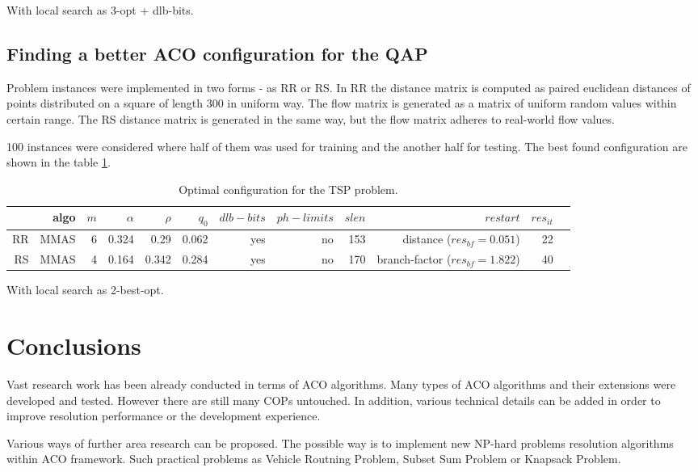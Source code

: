 \documentclass[12pt]{article}
\begin{document}
With local search as 3-opt + dlb-bits.

\subsection{Finding a better ACO configuration for the QAP}

Problem instances were implemented in two forms - as RR or RS. In RR the distance matrix is computed as paired euclidean distances of points distributed on a square of length 300 in uniform way. The flow matrix is generated as a matrix of uniform random values within certain range. The RS distance matrix is generated in the same way, but the flow matrix adheres to real-world flow values.

100 instances were considered where half of them was used for training and the another half for testing. The best found configuration are shown in the table \ref{table:table-qap}.

\begin{table}[ht]
\centering
\resizebox{\textwidth}{!}
{
\begin{tabular}{|r|r|r|r|r|r|r|r|r|r|r|r|}
  \hline 
    & algo & $m$ & $\alpha$ & $\rho$ & $q_0$ & $dlb-bits$ & $ph-limits$ & $slen$ & $restart$ & $res_{it}$\\ \hline
    RR & MMAS & 6 & 0.324 & 0.29 & 0.062 & yes & no & 153 & distance ($res_{bf} = 0.051$) & 22\\ \hline
	RS & MMAS & 4 & 0.164 & 0.342 & 0.284 & yes & no & 170 & branch-factor ($res_{bf} = 1.822$) & 40\\ \hline
\end{tabular}
}
\caption{Optimal configuration for the TSP problem.}
\label{table:table-qap} 
\end{table} 

With local search as 2-best-opt.

\section{Conclusions}

Vast research work has been already conducted in terms of ACO algorithms. Many types of ACO algorithms and their extensions were developed and tested. However there are still many COPs untouched. In addition, various technical details can be added in order to improve resolution performance or the development experience. 

Various ways of further area research can be proposed. The possible way is to implement new NP-hard problems resolution algorithms within ACO framework. Such practical problems as Vehicle Routning Problem, Subset Sum Problem or Knapsack Problem.
\end{document}
